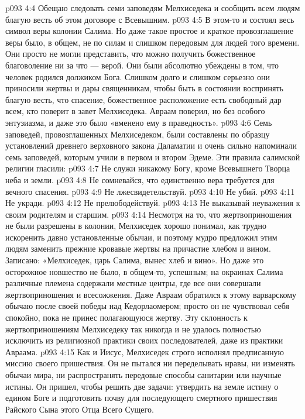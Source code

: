 \vs p093 4:4 \bibnobreakspace Обещаю следовать семи заповедям Мелхиседека и сообщить всем людям благую весть об этом договоре с Всевышним.
\vs p093 4:5 \pc В этом\hyp{}то и состоял весь символ веры колонии Салима. Но даже такое простое и краткое провозглашение веры было, в общем, не по силам и слишком передовым для людей того времени. Они просто не могли представить, что можно получить божественное благоволение ни за что --- верой. Они были абсолютно убеждены в том, что человек родился должиком Бога. Слишком долго и слишком серьезно они приносили жертвы и дары священникам, чтобы быть в состоянии воспринять благую весть, что спасение, божественное расположение есть свободный дар всем, кто поверит в завет Мелхиседека. Авраам поверил, но без особого энтузиазма, и даже это было «вменено ему в праведность».
\vs p093 4:6 \pc Семь заповедей, провозглашенных Мелхиседеком, были составлены по образцу установлений древнего верховного закона Даламатии и очень сильно напоминали семь заповедей, которым учили в первом и втором Эдеме. Эти правила салимской религии гласили:
\vs p093 4:7 \bibnobreakspace Не служи никакому Богу, кроме Всевышнего Творца неба и земли.
\vs p093 4:8 \bibnobreakspace Не сомневайся, что единственно вера требуется для вечного спасения.
\vs p093 4:9 \bibnobreakspace Не лжесвидетельствуй.
\vs p093 4:10 \bibnobreakspace Не убий.
\vs p093 4:11 \bibnobreakspace Не укради.
\vs p093 4:12 \bibnobreakspace Не прелюбодействуй.
\vs p093 4:13 \bibnobreakspace Не выказывай неуважения к своим родителям и старшим.
\vs p093 4:14 \pc Несмотря на то, что жертвоприношения не были разрешены в колонии, Мелхиседек хорошо понимал, как трудно искоренить давно установленные обычаи, и поэтому мудро предложил этим людям заменить прежние кровавые жертвы на причастие хлебом и вином. Записано: «Мелхиседек, царь Салима, вынес хлеб и вино». Но даже это осторожное новшество не было, в общем\hyp{}то, успешным; на окраинах Салима различные племена содержали местные центры, где все они совершали жертвоприношения и всесожжения. Даже Авраам обратился к этому варварскому обычаю после своей победы над Кедорлаомером; просто он не чувствовал себя спокойно, пока не принес полагающуюся жертву. Эту склонность к жертвоприношениям Мелхиседеку так никогда и не удалось полностью исключить из религиозной практики своих последователей, даже из практики Авраама.
\vs p093 4:15 Как и Иисус, Мелхиседек строго исполнял предписанную миссию своего пришествия. Он не пытался ни переделывать нравы, ни изменять обычаи мира, ни распространять передовые способы санитарии или научные истины. Он пришел, чтобы решить две задачи: утвердить на земле истину о едином Боге и подготовить почву для последующего смертного пришествия Райского Сына этого Отца Всего Сущего.
